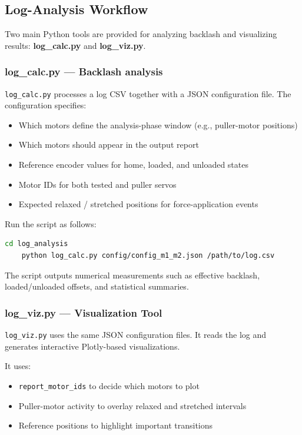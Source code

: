 \documentclass[11pt,letterpaper]{article}
\begin{document}
\subsection{Log-Analysis Workflow}
\label{subsec:log-workflow}

Two main Python tools are provided for analyzing backlash and visualizing results: \textbf{log\_calc.py} and \textbf{log\_viz.py}.

\subsubsection{log\_calc.py — Backlash analysis}
\label{subsubsec:log-calc}

\texttt{log\_calc.py} processes a log CSV together with a JSON configuration file. The configuration specifies:

\begin{itemize}
    \item Which motors define the analysis-phase window (e.g., puller-motor positions)
    \item Which motors should appear in the output report
    \item Reference encoder values for home, loaded, and unloaded states
    \item Motor IDs for both tested and puller servos
    \item Expected relaxed / stretched positions for force-application events
\end{itemize}

Run the script as follows:

\begin{lstlisting}[language=bash]
    cd log_analysis
    python log_calc.py config/config_m1_m2.json /path/to/log.csv
\end{lstlisting}

The script outputs numerical measurements such as effective backlash, loaded/unloaded offsets, and statistical summaries.

\subsubsection{log\_viz.py — Visualization Tool}
\label{subsubsec:log-viz}

\texttt{log\_viz.py} uses the same JSON configuration files. It reads the log and generates interactive Plotly-based visualizations.

It uses:

\begin{itemize}
    \item \texttt{report\_motor\_ids} to decide which motors to plot
    \item Puller-motor activity to overlay relaxed and stretched intervals
    \item Reference positions to highlight important transitions
\end{itemize}
\end{document}
